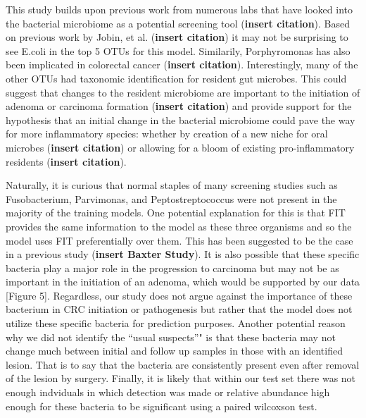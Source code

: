 \documentclass[12pt,]{article}
\begin{document}
This study builds upon previous work from numerous labs that have looked
into the bacterial microbiome as a potential screening tool
(\textbf{insert citation}). Based on previous work by Jobin, et al.
(\textbf{insert citation}) it may not be surprising to see E.coli in the
top 5 OTUs for this model. Similarily, Porphyromonas has also been
implicated in colorectal cancer (\textbf{insert citation}).
Interestingly, many of the other OTUs had taxonomic identification for
resident gut microbes. This could suggest that changes to the resident
microbiome are important to the initiation of adenoma or carcinoma
formation (\textbf{insert citation}) and provide support for the
hypothesis that an initial change in the bacterial microbiome could pave
the way for more inflammatory species: whether by creation of a new
niche for oral microbes (\textbf{insert citation}) or allowing for a
bloom of existing pro-inflammatory residents (\textbf{insert citation}).

Naturally, it is curious that normal staples of many screening studies
such as Fusobacterium, Parvimonas, and Peptostreptococcus were not
present in the majority of the training models. One potential
explanation for this is that FIT provides the same information to the
model as these three organisms and so the model uses FIT preferentially
over them. This has been suggested to be the case in a previous study
(\textbf{insert Baxter Study}). It is also possible that these specific
bacteria play a major role in the progression to carcinoma but may not
be as important in the initiation of an adenoma, which would be
supported by our data {[}Figure 5{]}. Regardless, our study does not
argue against the importance of these bacterium in CRC initiation or
pathogenesis but rather that the model does not utilize these specific
bacteria for prediction purposes. Another potential reason why we did
not identify the ``usual suspects''" is that these bacteria may not
change much between initial and follow up samples in those with an
identified lesion. That is to say that the bacteria are consistently
present even after removal of the lesion by surgery. Finally, it is
likely that within our test set there was not enough indviduals in which
detection was made or relative abundance high enough for these bacteria
to be significant using a paired wilcoxson test.
\end{document}
